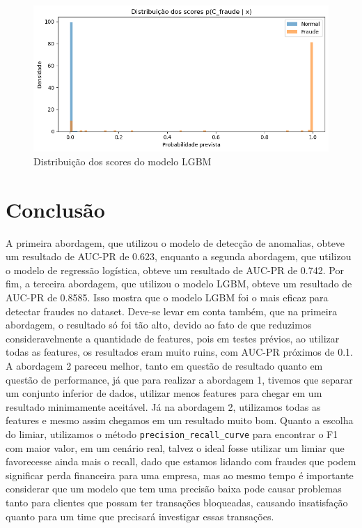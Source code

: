 \documentclass[conference]{IEEEtran}
\begin{document}
\begin{figure}[H]
    \centerline{\includegraphics[width=0.8\linewidth]{../output/distribuicao scores lgbm.png}}
    \caption{Distribuição dos scores do modelo LGBM}
    \label{fig:distribuicao_scores_lgbm}
\end{figure}

\section{Conclusão}
\label{sec:conclusao}
A primeira abordagem, que utilizou o modelo de detecção de anomalias, obteve um resultado de AUC-PR de 0.623, enquanto a segunda abordagem, que utilizou o modelo de regressão logística, obteve um resultado de AUC-PR de 0.742. Por fim, a terceira abordagem, que utilizou o modelo LGBM, obteve um resultado de AUC-PR de 0.8585. Isso mostra que o modelo LGBM foi o mais eficaz para detectar fraudes no dataset. Deve-se levar em conta também, que na primeira abordagem, o resultado só foi tão alto, devido ao fato de que reduzimos consideravelmente a quantidade de features, pois em testes prévios, ao utilizar todas as features, os resultados eram muito ruins, com AUC-PR próximos de 0.1. A abordagem 2 pareceu melhor, tanto em questão de resultado quanto em questão de performance, já que para realizar a abordagem 1, tivemos que separar um conjunto inferior de dados, utilizar menos features para chegar em um resultado minimamente aceitável. Já na abordagem 2, utilizamos todas as features e mesmo assim chegamos em um resultado muito bom. Quanto a escolha do limiar, utilizamos o método \texttt{precision\_recall\_curve} para encontrar o F1 com maior valor, em um cenário real, talvez o ideal fosse utilizar um limiar que favorecesse ainda mais o recall, dado que estamos lidando com fraudes que podem significar perda financeira para uma empresa, mas ao mesmo tempo é importante considerar que um modelo que tem uma precisão baixa pode causar problemas tanto para clientes que possam ter transações bloqueadas, causando insatisfação quanto para um time que precisará investigar essas transações.
\end{document}
